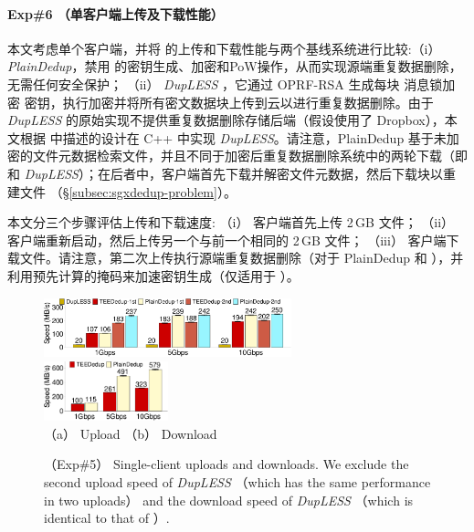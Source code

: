 \paragraph*{Exp\#6 （单客户端上传及下载性能）} 本文考虑单个客户端，并将 \sysnameS 的上传和下载性能与两个基线系统进行比较:（i） \textit{ PlainDedup}，禁用 \sysnameS 的密钥生成、加密和PoW操作，从而实现源端重复数据删除，无需任何安全保护； （ii） \textit{ {\em DupLESS}} \cite{bellare2013DupLESS}，它通过 OPRF-RSA 生成每块 消息锁加密 密钥，执行加密并将所有密文数据块上传到云以进行重复数据删除。由于 {\em DupLESS} 的原始实现不提供重复数据删除存储后端（假设使用了 Dropbox），本文根据 \cite{bellare2013DupLESS} 中描述的设计在 C++ 中实现 {\em DupLESS}。请注意，PlainDedup 基于未加密的文件元数据检索文件，并且不同于加密后重复数据删除系统中的两轮下载（即 \sysnameS 和 {\em DupLESS}）；在后者中，客户端首先下载并解密文件元数据，然后下载块以重建文件 （\S\ref{subsec:sgxdedup-problem}）。

本文分三个步骤评估上传和下载速度: （i） 客户端首先上传 2\,GB 文件； （ii） 客户端重新启动，然后上传另一个与前一个相同的 2\,GB 文件； （iii） 客户端下载文件。请注意，第二次上传执行源端重复数据删除（对于 PlainDedup 和 \sysnameS），并利用预先计算的掩码来加速密钥生成（仅适用于 \sysnameS）。


\begin{figure}[!htb]
    \centering
    \includegraphics[width=0.64\textwidth]{pic/sgxdedup/upload_network_speed_bar.pdf} \ \ 
    \includegraphics[width=0.32\textwidth]{pic/sgxdedup/download_network_speed_bar.pdf}
    \vspace{-3pt}\\
      \hspace{1.1in} {\small （a） Upload} \hspace{1.9in}
    {\small （b） Download}
    \vspace{-6pt}\\
    \caption{（Exp\#5） Single-client uploads and downloads. We exclude the second upload speed of {\em DupLESS} （which has the same performance in two uploads） and the download speed of {\em DupLESS} （which is identical to that of  \sysnameS）.}
    \label{fig:sgxdedup-singleClientThroughput}
\end{figure}

